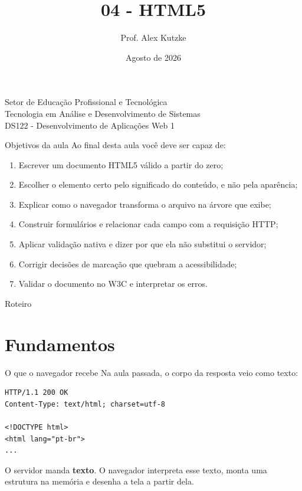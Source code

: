 \documentclass{beamer}
\title{04 - HTML5}
\author{Prof. Alex Kutzke}
\date{Agosto de 2026}
\begin{document}
\begin{frame}
  \begin{center}
    \large{Setor de Educação Profissional e Tecnológica}\\
    Tecnologia em Análise e Desenvolvimento de Sistemas\\
    \vspace{1cm}
    \small{DS122 - Desenvolvimento de Aplicações Web 1}
  \end{center}
  \titlepage
\end{frame}

\begin{frame}{Objetivos da aula}
  Ao final desta aula você deve ser capaz de:
  \begin{enumerate}
    \item Escrever um documento HTML5 válido a partir do zero;
    \item Escolher o elemento certo pelo significado do conteúdo, e não pela
          aparência;
    \item Explicar como o navegador transforma o arquivo na árvore que exibe;
    \item Construir formulários e relacionar cada campo com a requisição HTTP;
    \item Aplicar validação nativa e dizer por que ela não substitui o servidor;
    \item Corrigir decisões de marcação que quebram a acessibilidade;
    \item Validar o documento no W3C e interpretar os erros.
  \end{enumerate}
\end{frame}

\begin{frame}{Roteiro}
  \tableofcontents
\end{frame}

\section{Fundamentos}

\begin{frame}[fragile]{O que o navegador recebe}
  Na aula passada, o corpo da resposta veio como texto:

  \begin{verbatim}
HTTP/1.1 200 OK
Content-Type: text/html; charset=utf-8

<!DOCTYPE html>
<html lang="pt-br">
...
  \end{verbatim}

  \vspace{0.3cm}
  O servidor manda \textbf{texto}. O navegador interpreta esse texto, monta uma
  estrutura na memória e desenha a tela a partir dela.
\end{frame}
\end{document}
